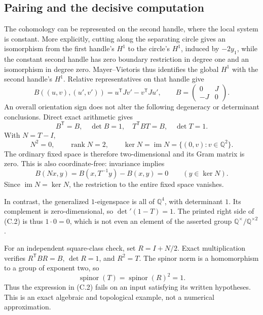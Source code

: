 \documentclass[10pt]{article}
\begin{document}
\subsection*{Pairing and the decisive computation}
The cohomology can be represented on the second handle, where the local system is constant. More explicitly, cutting along the separating circle gives an isomorphism from the first handle’s \(H^1\) to the circle’s \(H^1\), induced by \(-2y_1\), while the constant second handle has zero boundary restriction in degree one and an isomorphism in degree zero. Mayer–Vietoris thus identifies the global \(H^1\) with the second handle’s \(H^1\). Relative representatives on that handle give \[B((u,v),(u',v'))=u^{\mathsf T}Jv'-v^{\mathsf T}Ju',
 \qquad B=\begin{pmatrix}0&J\\-J&0\end{pmatrix}.\] An overall orientation sign does not alter the following degeneracy or determinant conclusions. Direct exact arithmetic gives \[B^{\mathsf T}=B,\quad \det B=1,\quad T^{\mathsf T}BT=B,\quad \det T=1.\] With \(N=T-I\), \[N^2=0,\qquad \operatorname{rank}N=2,\qquad
 \ker N=\operatorname{im}N=\{(0,v):v\in\mathbb Q^2\}.\] The ordinary fixed space is therefore two-dimensional and its Gram matrix is zero. This is also coordinate-free: invariance implies \[B(Nx,y)=B(x,T^{-1}y)-B(x,y)=0\qquad(y\in\ker N).\] Since \(\operatorname{im}N=\ker N\), the restriction to the entire fixed space vanishes.\par
In contrast, the generalized \(1\)-eigenspace is all of \(\mathbb Q^4\), with determinant \(1\). Its complement is zero-dimensional, so \(\det{}'(1-T)=1\). The printed right side of (C.2) is thus \(1\cdot0=0\), which is not even an element of the asserted group \(\mathbb Q^\times/\mathbb Q^{\times2}\).\par
For an independent square-class check, set \(R=I+N/2\). Exact multiplication verifies \(R^{\mathsf T}BR=B\), \(\det R=1\), and \(R^2=T\). The spinor norm is a homomorphism to a group of exponent two, so \[\operatorname{spinor}(T)=\operatorname{spinor}(R)^2=1.\] Thus the expression in (C.2) fails on an input satisfying its written hypotheses. This is an exact algebraic and topological example, not a numerical approximation.\par
\end{document}
